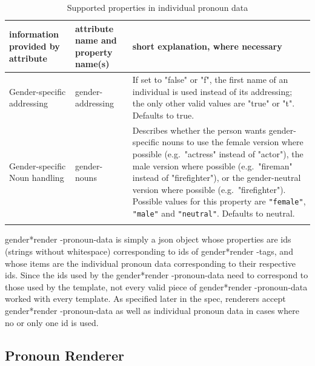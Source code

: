 \documentclass{article}
\newcommand{\GenderRender}{
    gender*render
}
\begin{document}
    \begin{flushleft}
        \begin{center}
            \begin{longtable}{|>{\raggedright\arraybackslash}p{7em} | >{\raggedright\arraybackslash}p{9em} | >{\raggedright\arraybackslash}p{14em} |}
                 \hline
                 information provided by attribute & attribute name and property name(s) & short explanation, where necessary\\
                 \hline\hline
                 Gender-specific addressing & gender-addressing & If set to "false" or "f", the first name of an individual is used instead of its addressing;
                 the only other valid values are "true" or "t".
                 Defaults to true.\\
                 \hline
                 Gender-specific Noun handling & gender-nouns & Describes whether the person wants gender-specific nouns to use the female version where possible (e.g.\ "actress" instead of "actor"), the male version where possible (e.g.\ "fireman" instead of "firefighter"), or the gender-neutral version where possible (e.g.\ "firefighter").
                 Possible values for this property are \texttt{"female"}, \texttt{"male"} and \texttt{"neutral"}.
                 Defaults to neutral.\\
                 \hline
                \caption{Supported properties in individual pronoun data}
            \end{longtable}
        \end{center}
    \end{flushleft}

    \GenderRender-pronoun-data is simply a json object whose properties are ids (strings without whitespace) corresponding to ids of \GenderRender-tags, and whose items are the individual pronoun data corresponding to their respective ids.
    Since the ids used by the \GenderRender-pronoun-data need to correspond to those used by the template, not every valid piece of \GenderRender-pronoun-data worked with every template.
    As specified later in the spec, renderers accept \GenderRender-pronoun-data as well as individual pronoun data in cases where no or only one id is used.

    \subsection{Pronoun Renderer}
\end{document}
